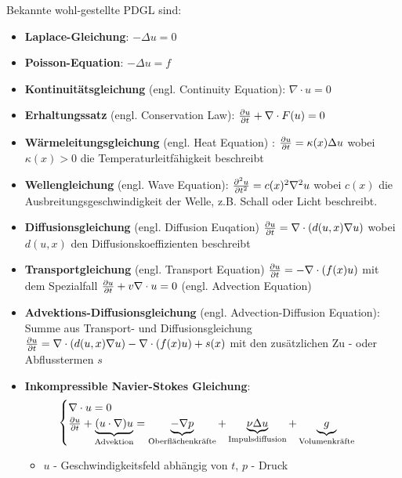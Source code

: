 \begin{definition}
	Bekannte wohl-gestellte PDGL sind:
	\begin{itemize}[noitemsep]
		\item \textbf{Laplace-Gleichung}: $-\Delta u = 0$
		\item \textbf{Poisson-Equation}: $-\Delta u = f$
		\item \textbf{Kontinuitätsgleichung} (engl. Continuity Equation): $\nabla \cdot u = 0$
		\item  \textbf{Erhaltungssatz} (engl. Conservation Law): $\frac{\partial u}{\partial t} + \nabla \cdot F(u) = 0$
		\item \textbf{Wärmeleitungsgleichung} (engl. Heat Equation) :  $\frac{\partial u}{\partial t} = \kappa(x) \Delta u$ wobei $\kappa(x) > 0$ die  Temperaturleitfähigkeit beschreibt
		\item \textbf{Wellengleichung} (engl. Wave Equation): $\frac{\partial ^2 u}{\partial t^2} = c(x)^2 \nabla^2 u $ wobei $c(x)$ die Ausbreitungsgeschwindigkeit der Welle, z.B. Schall oder Licht beschreibt.
		\item \textbf{Diffusionsgleichung} (engl. Diffusion Euqation) $\frac{\partial u}{\partial t} = \nabla \cdot (d(u, x) \nabla u) $ wobei $d(u,x)$ den Diffusionskoeffizienten beschreibt
		\item \textbf{Transportgleichung} (engl. Transport Equation) $\frac{\partial u}{\partial t} = - \nabla \cdot (f(x) u)$ mit dem Spezialfall $\frac{\partial u}{\partial t} + v \nabla \cdot u = 0$ (engl. Advection Equation)
		\item \textbf{Advektions-Diffusionsgleichung} (engl. Advection-Diffusion Equation): Summe aus Transport- und Diffusionsgleichung $\frac{\partial u}{\partial t} = \nabla \cdot (d(u, x) \nabla u) - \nabla \cdot (f(x) u) + s(x) $ mit den zusätzlichen Zu - oder Abflusstermen $s$
		\item \textbf{Inkompressible Navier-Stokes Gleichung}: 
		\begin{align*}
			\begin{cases}
				\nabla \cdot u = 0 \\
				\frac{\partial u}{\partial t} + \underbrace{(u \cdot \nabla)u}_{\text{Advektion}} =\underbrace{ - \nabla p}_{\text{Oberflächenkräfte}} + \underbrace{\nu \Delta u}_{\text{Impulsdiffusion}} + \underbrace{g}_{\text{Volumenkräfte}}
			\end{cases}
		\end{align*} 
		\begin{itemize}[noitemsep]
			\item  $u$ - Geschwindigkeitsfeld abhängig von $t$,  $p$ - Druck	

\end{itemize}
\end{itemize}
\end{definition}
